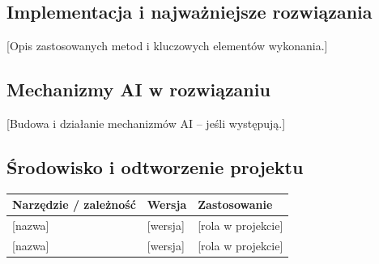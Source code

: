 \documentclass[11pt,a4paper,oneside]{article}
\newif\ifpodpowiedzi
\newcommand{\podpowiedz}[1]{\ifpodpowiedzi\par\begingroup\small\color{hintcolor}\textit{Wskazówka: #1}\par\endgroup\fi}
\newcommand{\pole}[1]{\textnormal{[#1]}}
\begin{document}
\subsection{Implementacja i najważniejsze rozwiązania}
\podpowiedz{Dla projektu programistycznego opisz istotne moduły, klasy, funkcje, interfejsy i algorytmy. Podaj znaczenie parametrów, wyniki, ograniczenia i obsługę błędów tam, gdzie jest to potrzebne. Nie wymaga się przepisywania całego kodu ani opisu każdej zmiennej. Dokumentację generowaną z kodu można dołączyć lub wskazać jako osobny materiał.}
\podpowiedz{Dla projektu bez kodu opisz odpowiednie metody wykonania, np. modelowanie, rigging, animację, oświetlenie, rendering i montaż. Podaj istotne ustawienia i uzasadnij ich dobór. Usuń wskazówki nieodnoszące się do projektu.}
\pole{Opis zastosowanych metod i kluczowych elementów wykonania.}

\newpage
\subsection{Mechanizmy AI w rozwiązaniu}
\podpowiedz{Ta podsekcja dotyczy AI stanowiącej część projektu. Opisz model lub usługę, wersję, zadanie, dane wejściowe i wyjściowe, integrację, konfigurację i ograniczenia. Jeśli rozwiązanie obejmuje uczenie, opisz dane, podział zbiorów, parametry i ocenę wyników. Dla usług zewnętrznych wskaż wymagane połączenia i zależności, bez ujawniania kluczy dostępowych. Jeśli AI tylko wspomagała pracę zespołu, jej wykorzystanie opisz w sprawozdaniu, a tę podsekcję usuń.}
\pole{Budowa i działanie mechanizmów AI -- jeśli występują.}

\subsection{Środowisko i odtworzenie projektu}
\podpowiedz{Opisz środowisko potrzebne do dalszej edycji, budowania lub odtworzenia rezultatu: system operacyjny, sprzęt, programy, biblioteki i ich wersje. Dla animacji wskaż np. wersję programu, dodatki, silnik renderujący i ustawienia eksportu. Szczegółową instrukcję instalacji i konfiguracji można wskazać w osobnej dokumentacji instalacyjno-konfiguracyjnej, jeśli jest wymagana. Nie powielaj tych samych informacji; podaj odwołanie do odpowiedniej sekcji.}
\begin{tabularx}{\textwidth}{@{}Y l Y@{}}
\toprule
Narzędzie / zależność & Wersja & Zastosowanie\\
\midrule
\pole{nazwa} & \pole{wersja} & \pole{rola w projekcie}\\
\pole{nazwa} & \pole{wersja} & \pole{rola w projekcie}\\
\bottomrule
\end{tabularx}
\end{document}
